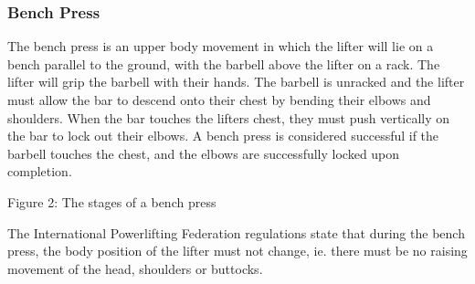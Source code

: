 \subsubsection{Bench Press}

The bench press is an upper body movement in which the lifter will lie on a bench parallel to the ground, with the barbell above the lifter on a rack. The lifter will grip the barbell with their hands. The barbell is unracked and the lifter must allow the bar to descend onto their chest by bending their elbows and shoulders. When the bar touches the lifters chest, they must push vertically on the bar to lock out their elbows. A bench press is considered successful if the barbell touches the chest, and the elbows are successfully locked upon completion.

Figure 2: The stages of a bench press

The International Powerlifting Federation regulations\cite{ipf} state that during the bench press, the body position of the lifter must not change, ie. there must be no raising movement of the head, shoulders or buttocks.